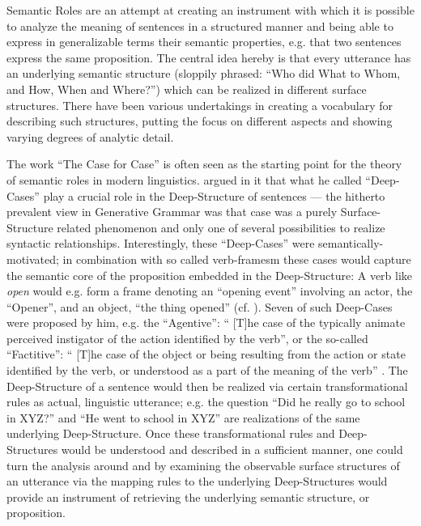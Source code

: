 Semantic Roles are an attempt at creating an instrument with which it is possible to analyze the
meaning of sentences in a structured manner and being able to express in generalizable terms
their semantic properties, e.g. that two sentences express the same proposition. The central idea
hereby is that every utterance has an underlying semantic structure
(sloppily phrased: ``Who did What to Whom, and How, When and Where?'') which can be realized in
different surface structures. There have been various undertakings in creating a vocabulary for
describing such structures, putting the focus on different aspects and showing varying degrees of
{\color{red} analytic detail}.

The work ``The Case for Case'' \citep{fillmore1967case} is often seen as the starting point
for the theory of semantic roles in modern linguistics. \citeauthor{fillmore1967case}
argued in it that what he called ``Deep-Cases'' play a crucial role in the Deep-Structure
of sentences --- the hitherto prevalent view in Generative Grammar was that case was a
purely Surface-Structure related phenomenon and only one of several possibilities to realize
syntactic relationships. Interestingly, these ``Deep-Cases'' were semantically-motivated; in
combination with so called verb-framesm these cases would capture the semantic core of the
proposition embedded in the Deep-Structure: A verb like \emph{open} would e.g. form a frame
denoting an ``opening event'' involving an actor, the ``Opener'', and an object, ``the thing
opened'' (cf. \cite[p.~46f.]{fillmore1967case}). Seven of such Deep-Cases were proposed by
him, e.g. the ``Agentive'': `` [T]he case of the typically animate perceived instigator of
the action identified by the verb'', or the so-called ``Factitive'': `` [T]he case of the
object or being resulting from the action or state identified by the verb, or understood as
a part of the meaning of the verb'' \citep[p.~46]{fillmore1967case}. The Deep-Structure of
a sentence would then be realized via certain transformational rules as actual, linguistic
utterance; e.g. the question ``Did he really go to school in XYZ?'' and ``He went to school
in XYZ'' are realizations of the same underlying Deep-Structure. Once these transformational
rules and Deep-Structures would be understood and described in a sufficient manner, one could
turn the analysis around and by examining the observable surface structures of an utterance
via the mapping rules to the underlying Deep-Structures would provide an instrument of
retrieving the underlying semantic structure, or proposition.

